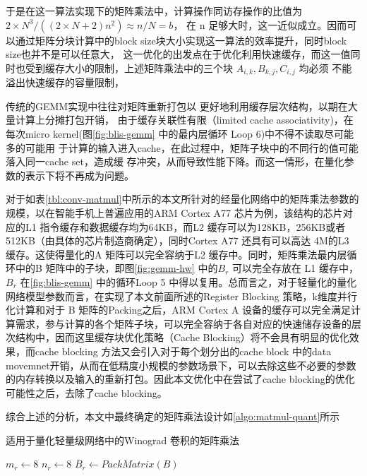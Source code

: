 于是在这一算法实现下的矩阵乘法中，计算操作同访存操作的比值为 $2\times N^3 / ((2\times N + 2)n^2) \approx n / N = b$，
在 n 足够大时，这一近似成立。因而可以通过矩阵分块计算中的block size块大小实现这一算法的效率提升，同时block size也并不是可以任意大，
这一优化的出发点在于优化利用快速缓存，而这一值同时也受到缓存大小的限制，上述矩阵乘法中的三个块 $A_{i, k}, B_{k, j}, C_{i, j} $ 均必须
不能溢出快速缓存的容量限制，

传统的GEMM实现中往往对矩阵重新打包以 更好地利用缓存层次结构，以期在大量计算上分摊打包开销，
由于缓存关联性有限（limited cache associativity)，在每次micro kernel(图\ref{fig:blis-gemm} 中的最内层循环 Loop 6)中不得不读取尽可能多的可能用
于计算的输入进入cache，在此过程中，矩阵子块中的不同行的值可能落入同一cache set，造成缓
存冲突，从而导致性能下降。而这一情形，在量化参数的表示下将不再成为问题。

对于如表\ref{tbl:conv-matmul}中所示的本文所针对的经量化网络中的矩阵乘法参数的规模，以在智能手机上普遍应用的ARM Cortex A77 芯片为例，该结构的芯片对应的L1 指令缓存和数据缓存均为64KB，而L2 缓存可以为128KB，256KB或者512KB（由具体的芯片制造商确定），同时Cortex A77 还具有可以高达 4M的L3 缓存。这使得量化的A 矩阵可以完全容纳于L2 缓存中。同时，矩阵乘法最内层循环中的B 矩阵中的子块，即图\ref{fig:gemm-hw} 中的$B_r$ 可以完全存放在 L1 缓存中，$B_r$ 在\ref{fig:blis-gemm} 中的循环Loop 5 中得以复用。总而言之，对于轻量化的量化网络模型参数而言，在实现了本文前面所述的Register Blocking 策略，k维度并行化计算和对于 B 矩阵的Packing之后，ARM Cortex A 设备的缓存可以完全满足计算需求，参与计算的各个矩阵子块，可以完全容纳于各自对应的快速储存设备的层次结构中，因而这里缓存块优化策略（Cache Blocking）将不会具有明显的优化效果，而cache blocking 方法又会引入对于每个划分出的cache block 中的data movemnet开销，从而在低精度小规模的参数场景下，可以去除这些不必要的参数的内存转换以及输入的重新打包。因此本文优化中在尝试了cache blocking的优化可能性之后，去除了cache blocking。

综合上述的分析，本文中最终确定的矩阵乘法设计如\ref{algo:matmul-quant}所示

\begin{algorithm}
  \caption{适用于量化轻量级网络中的Winograd 卷积的矩阵乘法}
  \begin{algorithmic}
    \State $m_r \gets 8 $ 
    \State $n_r \gets 8 $ 
    \State $B_r \gets PackMatrix(B)$ 
      \State {}
        \EndFor
      \EndFor
    \EndFor
  \end{algorithmic}
  \label{algo:matmul-quant}
\end{algorithm}

